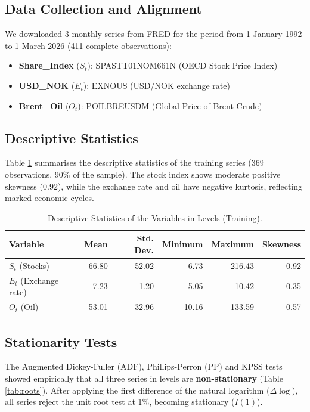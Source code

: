 \documentclass[11pt,a4paper]{article}
\begin{document}
\subsection{Data Collection and Alignment}
We downloaded 3 monthly series from FRED for the period from 1 January 1992 to 1 March 2026 (411 complete observations):
\begin{itemize}
    \item \textbf{Share\_Index} ($S_t$): SPASTT01NOM661N (OECD Stock Price Index)
    \item \textbf{USD\_NOK} ($E_t$): EXNOUS (USD/NOK exchange rate)
    \item \textbf{Brent\_Oil} ($O_t$): POILBREUSDM (Global Price of Brent Crude)
\end{itemize}

\subsection{Descriptive Statistics}
Table \ref{tab:desc} summarises the descriptive statistics of the training series (369 observations, 90\% of the sample). The stock index shows moderate positive skewness ($0.92$), while the exchange rate and oil have negative kurtosis, reflecting marked economic cycles.

\begin{table}[ht]
\centering
\small
\begin{tabular}{lrrrrr}
\toprule
\textbf{Variable} & \textbf{Mean} & \textbf{Std. Dev.} & \textbf{Minimum} & \textbf{Maximum} & \textbf{Skewness} \\
\midrule
$S_t$ (Stocks) & 66.80 & 52.02 & 6.73 & 216.43 & 0.92 \\
$E_t$ (Exchange rate) & 7.23 & 1.20 & 5.05 & 10.42 & 0.35 \\
$O_t$ (Oil) & 53.01 & 32.96 & 10.16 & 133.59 & 0.57 \\
\bottomrule
\end{tabular}
\caption{Descriptive Statistics of the Variables in Levels (Training).}
\label{tab:desc}
\end{table}

\subsection{Stationarity Tests}
The Augmented Dickey-Fuller (ADF), Phillips-Perron (PP) and KPSS tests showed empirically that all three series in levels are \textbf{non-stationary} (Table \ref{tab:roots}). After applying the first difference of the natural logarithm ($\Delta \log$), all series reject the unit root test at 1\%, becoming stationary ($I(1)$).
\end{document}
